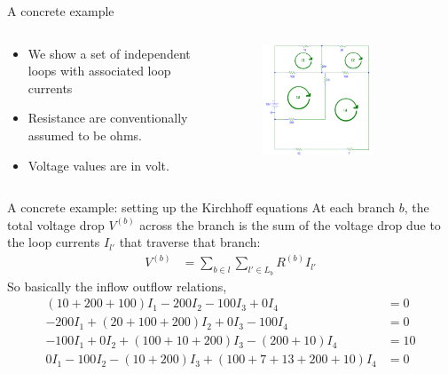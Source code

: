 \documentclass[xcolor=dvipsnames]{beamer}
\begin{document}
\begin{frame}{A concrete example}

   \begin{columns}
        \begin{column}{.45\textwidth}
        \begin{itemize}
        	\item We show a set of independent loops with associated loop currents
        	\item Resistance are conventionally assumed to be ohms.
        	\item Voltage values are in volt.
        \end{itemize}

        \end{column}
		\begin{column}{.65\textwidth}
 	     \begin{figure}[!ht]
  			\centering
    		\includegraphics[width=0.7\textwidth]{concreteEg.png}
    		\label{fig:eg5}
    	 \end{figure}
      	\end{column}
    \end{columns}
\end{frame}

\begin{frame}{A concrete example: setting up the Kirchhoff equations}
At each branch $b$, the total voltage drop $V^{(b)}$ across the branch is the sum of the voltage drop due to the loop currents $I_{l'}$ that traverse that branch:
\begin{align*}
	V^{(b)} &= \sum_{b\in l}\sum_{l'\in L_b} R^{(b)}I_{l'}
\end{align*}
So basically the inflow outflow relations,
\begin{align*}
	(10 + 200 + 100)I_1 - 200 I_2 - 100 I_3 + 0 I_4 &= 0\\
	-200 I_1 + (20 + 100 + 200) I_2 + 0 I_3 - 100 I_4 &= 0\\
	-100 I_1 + 0 I_2 + (100 + 10 + 200)I_3 - (200+10)I_4 &=10\\
	0 I_1 - 100 I_2 - (10+200) I_3 + (100 + 7 + 13 + 200 + 10) I_4 &= 0
\end{align*}
\end{frame}
\end{document}
